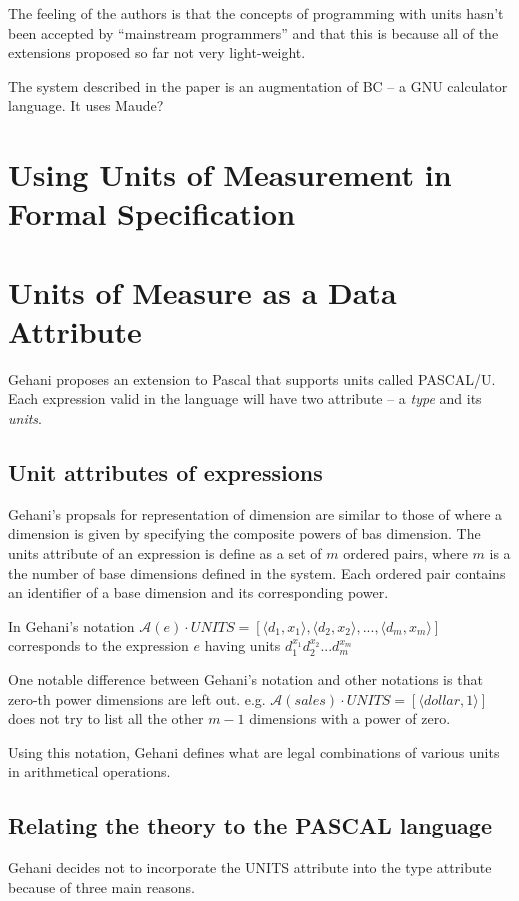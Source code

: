 \documentclass[a4paper]{article}
\begin{document}
The feeling of the authors is that the concepts of programming with units hasn't
been accepted by ``mainstream programmers'' and that this is because all of the
extensions proposed so far not very light-weight.

The system described in the paper is an augmentation of BC -- a GNU calculator
language. It uses Maude?

\section{Using Units of Measurement in Formal Specification \cite{ME_hayes}}

\section{Units of Measure as a Data Attribute \cite{ME_gehani}}

Gehani proposes an extension to Pascal that supports units called PASCAL/U.
Each expression valid in the language will have two attribute -- a \emph{type}
and its \emph{units}.

\subsection{Unit attributes of expressions}

Gehani's propsals for representation of dimension are similar to those of
\cite{ME_baldwin,ME_hamilton} where a dimension is given by specifying the
composite powers of bas dimension. The units attribute of an expression is 
define as a set of $m$  ordered pairs, where $m$ is a the number of 
base dimensions defined in the system. Each ordered pair contains an identifier
of a base dimension and its corresponding power.

In Gehani's notation
$\mathscr{A}(e)\cdot UNITS = [\langle d_1,x_1 \rangle,
				\langle d_2,x_2 \rangle,...,
				\langle d_m,x_m \rangle ]$
corresponds to the expression $e$ having units $d_1^{x_1}d_2^{x_2}...d_m^{x_m}$

One notable difference between Gehani's notation and other notations is that 
zero-th power dimensions are left out. e.g.
$\mathscr{A}(sales)\cdot UNITS = [\langle dollar, 1 \rangle]$
does not try to list all the other $m-1$ dimensions with a power of zero.

Using this notation, Gehani defines what are legal combinations of various 
units in arithmetical operations.

\subsection{Relating the theory to the PASCAL language}
Gehani decides not to incorporate the UNITS attribute into the type attribute 
because of three main reasons.
\end{document}
